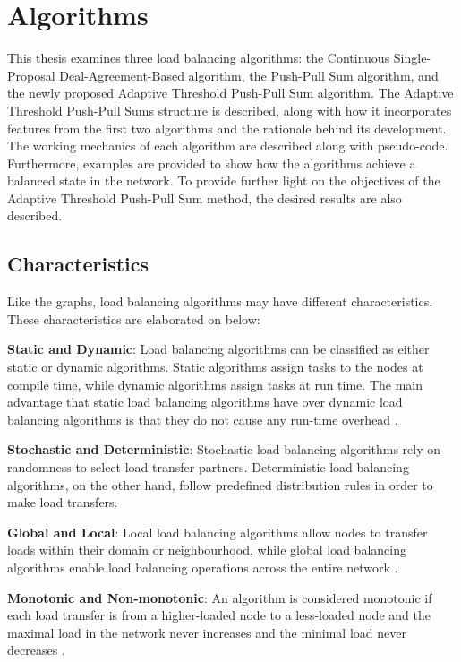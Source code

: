 \chapter{Algorithms}\label{chap:algorithms}
This thesis examines three load balancing algorithms: the Continuous Single-Proposal Deal-Agreement-Based algorithm, the Push-Pull Sum algorithm, and the newly proposed Adaptive Threshold Push-Pull Sum algorithm. The Adaptive Threshold Push-Pull Sums structure is described, along with how it incorporates features from the first two algorithms and the rationale behind its development. The working mechanics of each algorithm are described along with pseudo-code. Furthermore, examples are provided to show how the algorithms achieve a balanced state in the network. To provide further light on the objectives of the Adaptive Threshold Push-Pull Sum method, the desired results are also described.

\section{Characteristics}\label{sec:algoCharacteristics}
Like the graphs, load balancing algorithms may have different characteristics. These characteristics are elaborated on below:

\textbf{Static and Dynamic}: Load balancing algorithms can be classified as either static or dynamic algorithms. Static algorithms assign tasks to the nodes at compile time, while dynamic algorithms assign tasks at run time. The main advantage that static load balancing algorithms have over dynamic load balancing algorithms is that they do not cause any run-time overhead \cite{Bokhari}.

\textbf{Stochastic and Deterministic}: Stochastic load balancing algorithms rely on randomness to select load transfer partners. Deterministic load balancing algorithms, on the other hand, follow predefined distribution rules in order to make load transfers. \cite{ChengzhongFrancis}

\textbf{Global and Local}: Local load balancing algorithms allow nodes to transfer loads within their domain or neighbourhood, while global load balancing algorithms enable load balancing operations across the entire network \cite{ChengzhongFrancis}.

\textbf{Monotonic and Non-monotonic}: An algorithm is considered monotonic if each load transfer is from a higher-loaded node to a less-loaded node and the maximal load in the network never increases and the minimal load never decreases \cite{Dinitz2023DAB}.


